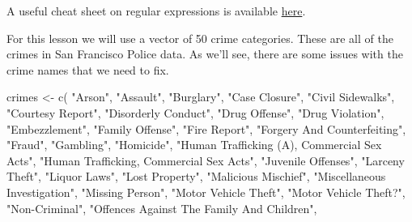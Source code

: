 \documentclass[
  12pt,
]{book}
\newenvironment{Shaded}{\begin{snugshade}}{\end{snugshade}}
\newcommand{\FunctionTok}[1]{\textcolor[rgb]{0,0,0}{#1}}
\newcommand{\NormalTok}[1]{#1}
\newcommand{\OtherTok}[1]{\textcolor[rgb]{0.37,0.37,0.37}{#1}}
\newcommand{\StringTok}[1]{\textcolor[rgb]{0.5,0.5,0.5}{#1}}
\begin{document}
A useful cheat sheet on regular expressions is available \href{https://www.rstudio.com/wp-content/uploads/2016/09/RegExCheatsheet.pdf}{here}.

For this lesson we will use a vector of 50 crime categories. These are all of the crimes in San Francisco Police data. As we'll see, there are some issues with the crime names that we need to fix.

\begin{Shaded}
\begin{Highlighting}[]
\NormalTok{crimes }\OtherTok{\textless{}{-}} \FunctionTok{c}\NormalTok{(}
  \StringTok{"Arson"}\NormalTok{,}
  \StringTok{"Assault"}\NormalTok{,                                  }
  \StringTok{"Burglary"}\NormalTok{,                                 }
  \StringTok{"Case Closure"}\NormalTok{,                             }
  \StringTok{"Civil Sidewalks"}\NormalTok{,                          }
  \StringTok{"Courtesy Report"}\NormalTok{,                          }
  \StringTok{"Disorderly Conduct"}\NormalTok{,                       }
  \StringTok{"Drug Offense"}\NormalTok{,                             }
  \StringTok{"Drug Violation"}\NormalTok{,                           }
  \StringTok{"Embezzlement"}\NormalTok{,                             }
  \StringTok{"Family Offense"}\NormalTok{,                           }
  \StringTok{"Fire Report"}\NormalTok{,                              }
  \StringTok{"Forgery And Counterfeiting"}\NormalTok{,               }
  \StringTok{"Fraud"}\NormalTok{,                                    }
  \StringTok{"Gambling"}\NormalTok{,                                 }
  \StringTok{"Homicide"}\NormalTok{,                                 }
  \StringTok{"Human Trafficking (A), Commercial Sex Acts"}\NormalTok{,}
  \StringTok{"Human Trafficking, Commercial Sex Acts"}\NormalTok{,   }
  \StringTok{"Juvenile Offenses"}\NormalTok{,                        }
  \StringTok{"Larceny Theft"}\NormalTok{,                            }
  \StringTok{"Liquor Laws"}\NormalTok{,                              }
  \StringTok{"Lost Property"}\NormalTok{,                            }
  \StringTok{"Malicious Mischief"}\NormalTok{,                       }
  \StringTok{"Miscellaneous Investigation"}\NormalTok{,              }
  \StringTok{"Missing Person"}\NormalTok{,                           }
  \StringTok{"Motor Vehicle Theft"}\NormalTok{,                      }
  \StringTok{"Motor Vehicle Theft?"}\NormalTok{,                     }
  \StringTok{"Non{-}Criminal"}\NormalTok{,                             }
  \StringTok{"Offences Against The Family And Children"}\NormalTok{, }

\end{Highlighting}
\end{Shaded}
\end{document}
